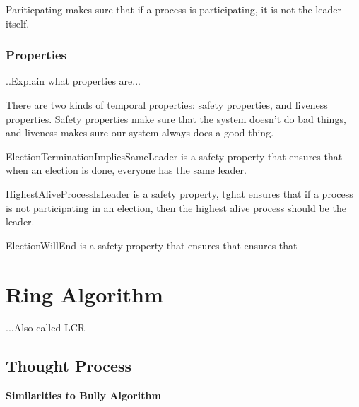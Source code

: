 \documentclass{report}
\begin{document}
\begin{calloutgreen}
\begin{calloutyellow}
Pariticpating makes sure that if a process is participating, it is not the leader itself.


\subsection{Properties}
..Explain what properties are...

There are two kinds of temporal properties: safety properties, and liveness properties. Safety properties make sure that the system doesn't do bad things, and liveness makes sure our system always does a good thing.\cite{https://learntla.com/core/temporal-logic.html}


\noindent{}

ElectionTerminationImpliesSameLeader is a safety property that ensures that when an election is done, everyone has the same leader.

HighestAliveProcessIsLeader is a safety property, tghat ensures that if a process is not participating in an election, then the highest alive process should be the leader.

ElectionWillEnd is a safety property that ensures that ensures that


\chapter{Ring Algorithm}

...Also called LCR

\section{Thought Process}

\lipsum[1]

\textbf{Similarities to Bully Algorithm}


\end{calloutyellow}
\end{calloutgreen}
\end{document}
